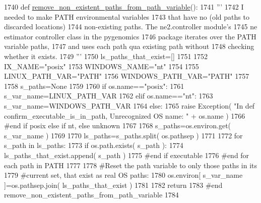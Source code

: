 \begin{DoxyCode}
1740 \textcolor{keyword}{def }\hyperlink{namespacenegui_1_1pgutilities_af67695b6ecd6a9c2958780ec78c4ee30}{remove\_non\_existent\_paths\_from\_path\_variable}():
1741     \textcolor{stringliteral}{'''}
1742 \textcolor{stringliteral}{    I needed to make PATH environmental variables}
1743 \textcolor{stringliteral}{    that have no (old paths to discarded locations)}
1744 \textcolor{stringliteral}{    non-existing paths.  The ne2.controller module's}
1745 \textcolor{stringliteral}{    ne estimator controller class in the pygenomics}
1746 \textcolor{stringliteral}{    package iterates over the PATH variable paths, }
1747 \textcolor{stringliteral}{    and uses each path qua existing path without}
1748 \textcolor{stringliteral}{    checking whether it exists.}
1749 \textcolor{stringliteral}{    '''}
1750     ls\_paths\_that\_exist=[]
1751 
1752     IX\_NAME=\textcolor{stringliteral}{"posix"}
1753     WINDOWS\_NAME=\textcolor{stringliteral}{"nt"}
1754 
1755     LINUX\_PATH\_VAR=\textcolor{stringliteral}{"PATH"}
1756     WINDOWS\_PATH\_VAR=\textcolor{stringliteral}{"PATH"}
1757 
1758     s\_paths=\textcolor{keywordtype}{None}
1759 
1760     \textcolor{keywordflow}{if} os.name==\textcolor{stringliteral}{"posix"}:
1761         s\_var\_name=LINUX\_PATH\_VAR
1762     \textcolor{keywordflow}{elif} os.name==\textcolor{stringliteral}{"nt"}:
1763         s\_var\_name=WINDOWS\_PATH\_VAR
1764     \textcolor{keywordflow}{else}:
1765         \textcolor{keywordflow}{raise} Exception( \textcolor{stringliteral}{"In def confirm\_executable\_is\_in\_path, Unrecognized OS name: "} + os.name )
1766     \textcolor{comment}{#end if posix else if nt, else unknown}
1767 
1768     s\_paths=os.environ.get( s\_var\_name )
1769 
1770     ls\_paths=s\_paths.split( os.pathsep )
1771     
1772     \textcolor{keywordflow}{for} s\_path \textcolor{keywordflow}{in} ls\_paths:
1773         \textcolor{keywordflow}{if} os.path.exists( s\_path ):
1774             ls\_paths\_that\_exist.append( s\_path )
1775         \textcolor{comment}{#end if executable}
1776     \textcolor{comment}{#end for each path in PATH}
1777 
1778     \textcolor{comment}{#Reset the path variable to only those paths in its}
1779     \textcolor{comment}{#current set, that exist as real OS paths:}
1780     os.environ[  s\_var\_name ]=os.pathsep.join( ls\_paths\_that\_exist )
1781 
1782     \textcolor{keywordflow}{return}
1783 \textcolor{comment}{#end remove\_non\_existent\_paths\_from\_path\_variable}
1784 
\end{DoxyCode}
